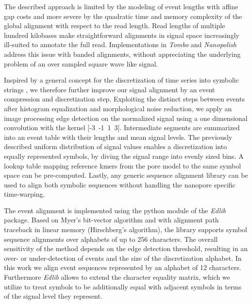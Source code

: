 The described approach is limited by the modeling of event lengths with affine gap costs and more severe by the quadratic time and memory complexity of the global alignment with respect to the read length. Read lengths of multiple hundred kilobases make straightforward alignments in signal space increasingly ill-suited to annotate the full read. Implementations in \textit{Tombo} and \textit{Nanopolish} \cite{Simpson2017, Gamaarachchi2020} address this issue with banded alignments, without appreciating the underlying problem of an over sampled square wave like signal.

Inspired by a general concept for the discretization of time series into symbolic strings \cite{Lin2003}, we therefore further improve our signal alignment by an event compression and discretization step. Exploiting the distinct steps between events after histogram equalization and morphological noise reduction, we apply an image processing edge detection on the normalized signal using a one dimensional convolution with the kernel [-3\ -1\ 1\ 3]. Intermediate segments are summarized into an event table with their lengths and mean signal levels. The previously described uniform distribution of signal values enables a discretization into equally represented symbols, by diving the signal range into evenly sized bins. A lookup table mapping reference kmers from the pore model to the same symbol space can be pre-computed. Lastly, any generic sequence alignment library can be used to align both symbolic sequences without handling the nanopore specific time-warping.

The event alignment is implemented using the python module of the \textit{Edlib} \cite{Sosic2017} package. Based on Myer's bit-vector algorithm and with alignment path traceback in linear memory (Hirschberg's algorithm), the library supports symbol sequence alignments over alphabets of up to 256 characters. The overall sensitivity of the method depends on the edge detection threshold, resulting in an over- or under-detection of events and the size of the discretization alphabet. In this work we align event sequences represented by an alphabet of 12 characters. Furthermore \textit{Edlib} allows to extend the character equality matrix, which we utilize to treat symbols to be additionally equal with adjacent symbols in terms of the signal level they represent.


